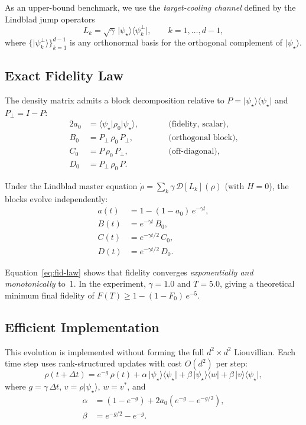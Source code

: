 \documentclass[11pt,a4paper]{article}
\newcommand{\ket}[1]{\lvert #1 \rangle}
\newcommand{\bra}[1]{\langle #1 \rvert}
\begin{document}
As an upper-bound benchmark, we use the \emph{target-cooling channel}
defined by the Lindblad jump operators
\begin{equation}\label{eq:teacher-jumps}
  L_k = \sqrt{\gamma}\,\ket{\psi_\star}\bra{\psi_k^\perp},
  \qquad k=1,\dots,d-1,
\end{equation}
where $\{\ket{\psi_k^\perp}\}_{k=1}^{d-1}$ is any orthonormal basis
for the orthogonal complement of $\ket{\psi_\star}$.

\subsection{Exact Fidelity Law}

The density matrix admits a block decomposition relative to
$P=\ket{\psi_\star}\bra{\psi_\star}$ and $P_\perp = I - P$:
\begin{alignat}{2}
  a_0 &= \bra{\psi_\star}\rho_0\ket{\psi_\star},
  &\qquad &\text{(fidelity, scalar)}, \\
  B_0 &= P_\perp\,\rho_0\,P_\perp,
  &\qquad &\text{(orthogonal block)}, \\
  C_0 &= P\,\rho_0\,P_\perp,
  &\qquad &\text{(off-diagonal)}, \\
  D_0 &= P_\perp\,\rho_0\,P.
  &\qquad &
\end{alignat}

Under the Lindblad master equation
$\dot\rho = \sum_k \gamma\,\mathcal{D}[L_k](\rho)$
(with $H=0$), the blocks evolve independently:
\begin{align}
  a(t) &= 1 - (1 - a_0)\,e^{-\gamma t}, \label{eq:fid-law}\\
  B(t) &= e^{-\gamma t}\,B_0, \\
  C(t) &= e^{-\gamma t/2}\,C_0, \\
  D(t) &= e^{-\gamma t/2}\,D_0.
\end{align}

Equation~\eqref{eq:fid-law} shows that fidelity converges
\emph{exponentially and monotonically} to~1.
In the experiment, $\gamma=1.0$ and $T=5.0$, giving a theoretical
minimum final fidelity of $F(T) \ge 1-(1-F_0)\,e^{-5}$.

\subsection{Efficient Implementation}

This evolution is implemented without forming the full $d^2\times d^2$
Liouvillian.  Each time step uses rank-structured updates
with cost $O(d^2)$ per step:
\begin{equation}
  \rho(t+\Delta t) = e^{-g}\,\rho(t)
  + \alpha\,\ket{\psi_\star}\bra{\psi_\star}
  + \beta\,\ket{\psi_\star}\bra{w}
  + \beta\,\ket{v}\bra{\psi_\star},
\end{equation}
where $g = \gamma\,\Delta t$, $v = \rho\ket{\psi_\star}$,
$w = v^*$, and
\begin{align}
  \alpha &= (1-e^{-g}) + 2a_0(e^{-g}-e^{-g/2}), \\
  \beta  &= e^{-g/2} - e^{-g}.
\end{align}
\end{document}
